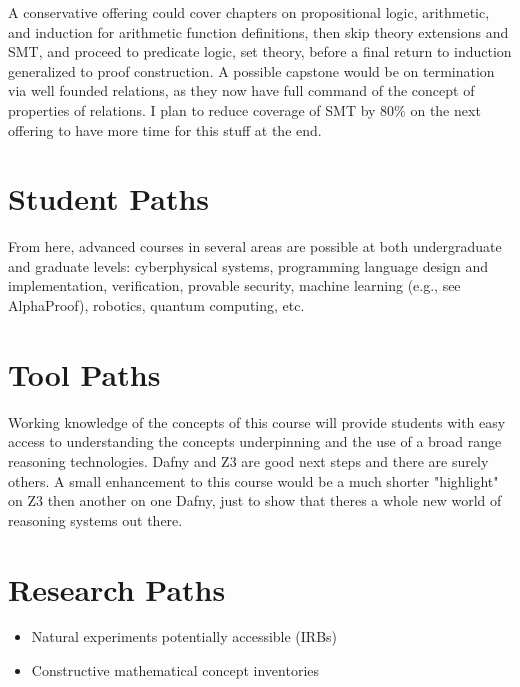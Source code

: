\documentclass{book}
\providecommand{\tightlist}{%
  \setlength{\itemsep}{0pt}\setlength{\parskip}{0pt}}
\begin{document}
A conservative offering could cover chapters on propositional logic, arithmetic, and induction for arithmetic function definitions, then skip theory extensions and SMT, and proceed to predicate logic, set theory, before a final return to induction generalized to proof construction. A possible capstone would be on termination via well founded relations, as they now have full command of the concept of properties of relations. I plan to reduce coverage of SMT by 80\% on the next offering to have more time for this stuff at the end.

\hypertarget{book__pandoc__debug__src__preface.md__student-paths}{%
\section*{Student Paths}\label{book__pandoc__debug__src__preface.md__student-paths}}

From here, advanced courses in several areas are possible at both undergraduate and graduate
levels: cyberphysical systems, programming language design and implementation, verification,
provable security, machine learning (e.g., see AlphaProof), robotics, quantum computing, etc.

\hypertarget{book__pandoc__debug__src__preface.md__tool-paths}{%
\section*{Tool Paths}\label{book__pandoc__debug__src__preface.md__tool-paths}}

Working knowledge of the concepts of this course will provide students with easy access to
understanding the concepts underpinning and the use of a broad range reasoning technologies. Dafny and Z3 are good next steps and there are surely others. A small enhancement to this course would be a much shorter "highlight" on Z3 then another on one Dafny, just to show that there\textquotesingle s a whole new world of reasoning systems out there.

\hypertarget{book__pandoc__debug__src__preface.md__research-paths}{%
\section*{Research Paths}\label{book__pandoc__debug__src__preface.md__research-paths}}

\begin{itemize}
\tightlist
\item
  Natural experiments potentially accessible (IRBs)
\item
  Constructive mathematical concept inventories
\end{itemize}
\end{document}
